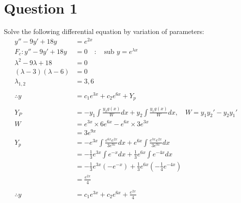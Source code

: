 \documentclass{article}
\begin{document}
\newcommand{\documentcourse}{MATH1851}
\newcommand{\documentnumber}{6}





\section*{Question 1}
Solve the following differential equation by variation of parameters:
\begin{align*}
    y''-9y'+18y            & =e^{2x}                                                                              \\
    F_c: y''-9y'+18y       & =0\quad:\quad\text{sub }y=e^{\lambda x}                                              \\
    \lambda^2-9\lambda+18  & =0                                                                                   \\
    (\lambda-3)(\lambda-6) & =0                                                                                   \\
    \lambda_{1,2}          & =3,6                                                                                 \\
    \\
    \therefore y           & =c_1e^{3x}+c_2e^{6x}+Y_p                                                             \\
    \\
    Y_{P}                  & =-y_1\int\frac{y_2g(x)}{W}dx+y_2\int\frac{y_1g(x)}{W}dx,\quad W=y_1y_2'-y_2y_1'      \\
    W                      & = e^{3x}\times 6e^{6x} - e^{6x}\times3e^{3x}                                         \\
                           & = 3e^{9x}                                                                            \\
    Y_p                    & = -e^{3x}\int\frac{e^{6x}e^{2x}}{3e^{9x}}dx+e^{6x}\int\frac{e^{3x}e^{2x}}{3e^{9x}}dx \\
                           & = -\frac{1}{3}e^{3x}\int e^{-x}dx+\frac{1}{3}e^{6x}\int e^{-4x}dx                    \\
                           & = -\frac{1}{3}e^{3x}(-e^{-x})+\frac{1}{3}e^{6x}(-\frac{1}{4}e^{-4x})                 \\
                           & = \frac{e^{2x}}{4}                                                                   \\
    \\
    \therefore y           & = c_1e^{3x}+c_2e^{6x}+\frac{e^{2x}}{4}                                               \\
\end{align*}
\end{document}
